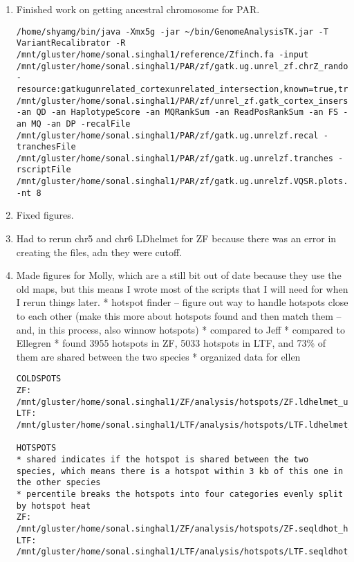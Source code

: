 \documentclass[idxtotoc,hyperref,openany,oneside]{labbook} %
\begin{document}
\begin{enumerate}
\item Finished work on getting ancestral chromosome for PAR.
\begin{verbatim}
/home/shyamg/bin/java -Xmx5g -jar ~/bin/GenomeAnalysisTK.jar -T VariantRecalibrator -R /mnt/gluster/home/sonal.singhal1/reference/Zfinch.fa -input /mnt/gluster/home/sonal.singhal1/PAR/zf/gatk.ug.unrel_zf.chrZ_random.raw.snps.vcf.gz -resource:gatkugunrelated_cortexunrelated_intersection,known=true,training=true,truth=true,prior=10.0 /mnt/gluster/home/sonal.singhal1/PAR/zf/unrel_zf.gatk_cortex_insersection.trusted_snps.vcf.gz -an QD -an HaplotypeScore -an MQRankSum -an ReadPosRankSum -an FS -an MQ -an DP -recalFile /mnt/gluster/home/sonal.singhal1/PAR/zf/gatk.ug.unrelzf.recal -tranchesFile /mnt/gluster/home/sonal.singhal1/PAR/zf/gatk.ug.unrelzf.tranches -rscriptFile /mnt/gluster/home/sonal.singhal1/PAR/zf/gatk.ug.unrelzf.VQSR.plots.R -nt 8
\end{verbatim}
\item Fixed figures.
\item Had to rerun chr5 and chr6 LDhelmet for ZF because there was an error in creating the files, adn they were cutoff.
\item Made figures for Molly, which are a still bit out of date because they use the old maps, but this means I wrote most of the scripts that I will need for when I rerun things later.
* hotspot finder 
	-- figure out way to handle hotspots close to each other (make this more about hotspots found and then match them -- and, in this process, also winnow hotspots)
* compared to Jeff
* compared to Ellegren
* found 3955 hotspots in ZF, 5033 hotspots in LTF, and 73\% of them are shared between the two species
* organized data for ellen
\begin{verbatim}
COLDSPOTS
ZF: /mnt/gluster/home/sonal.singhal1/ZF/analysis/hotspots/ZF.ldhelmet_unvalidated_coldspots.csv
LTF: /mnt/gluster/home/sonal.singhal1/LTF/analysis/hotspots/LTF.ldhelmet_unvalidated_coldspots.csv

HOTSPOTS
* shared indicates if the hotspot is shared between the two species, which means there is a hotspot within 3 kb of this one in the other species
* percentile breaks the hotspots into four categories evenly split by hotspot heat
ZF: /mnt/gluster/home/sonal.singhal1/ZF/analysis/hotspots/ZF.seqldhot_hotspots.heat5.csv
LTF: /mnt/gluster/home/sonal.singhal1/LTF/analysis/hotspots/LTF.seqldhot_hotspots.heat5.csv


\end{verbatim}
\end{enumerate}
\end{document}
